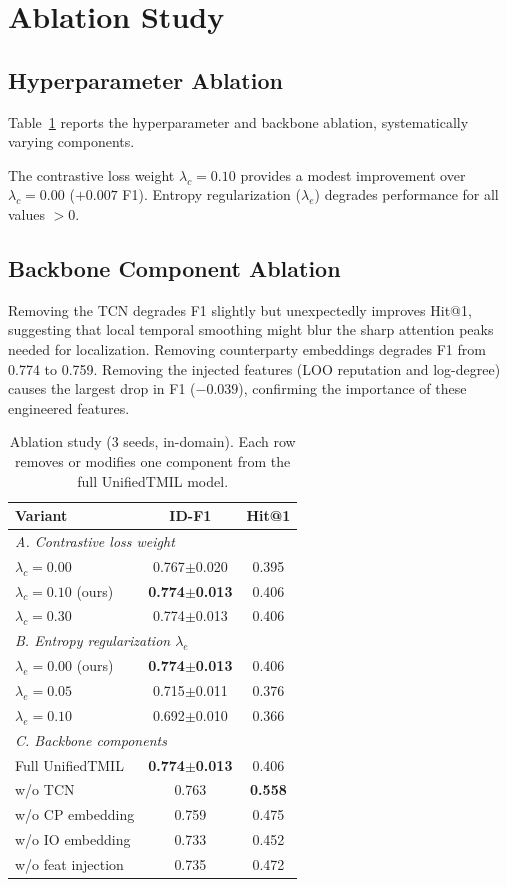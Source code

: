 \documentclass[conference]{IEEEtran}
\begin{document}
\section{Ablation Study}

\subsection{Hyperparameter Ablation}
Table~\ref{tab:abl} reports the hyperparameter and backbone ablation, systematically varying components.

The contrastive loss weight $\lambda_c=0.10$ provides a modest improvement over $\lambda_c=0.00$ ($+0.007$ F1). Entropy regularization ($\lambda_e$) degrades performance for all values $>0$.

\subsection{Backbone Component Ablation}
Removing the TCN degrades F1 slightly but unexpectedly improves Hit@1, suggesting that local temporal smoothing might blur the sharp attention peaks needed for localization. Removing counterparty embeddings degrades F1 from 0.774 to 0.759. Removing the injected features (LOO reputation and log-degree) causes the largest drop in F1 ($-0.039$), confirming the importance of these engineered features.

\begin{table}[!t]
\centering
\caption{Ablation study (3 seeds, in-domain). Each row removes or modifies one component from the full UnifiedTMIL model.}
\label{tab:abl}
\begin{tabular}{lcc}
\toprule
\textbf{Variant} & \textbf{ID-F1} & \textbf{Hit@1} \\
\midrule
\multicolumn{3}{l}{\emph{A. Contrastive loss weight}} \\
\quad $\lambda_c=0.00$ & 0.767$\pm$0.020 & 0.395 \\
\quad $\lambda_c=0.10$ (ours) & \textbf{0.774$\pm$0.013} & 0.406 \\
\quad $\lambda_c=0.30$ & 0.774$\pm$0.013 & 0.406 \\
\midrule
\multicolumn{3}{l}{\emph{B. Entropy regularization $\lambda_e$}} \\
\quad $\lambda_e=0.00$ (ours) & \textbf{0.774$\pm$0.013} & 0.406 \\
\quad $\lambda_e=0.05$ & 0.715$\pm$0.011 & 0.376 \\
\quad $\lambda_e=0.10$ & 0.692$\pm$0.010 & 0.366 \\
\midrule
\multicolumn{3}{l}{\emph{C. Backbone components}} \\
\quad Full UnifiedTMIL & \textbf{0.774$\pm$0.013} & 0.406 \\
\quad w/o TCN & 0.763 & \textbf{0.558} \\
\quad w/o CP embedding & 0.759 & 0.475 \\
\quad w/o IO embedding & 0.733 & 0.452 \\
\quad w/o feat injection & 0.735 & 0.472 \\
\bottomrule
\end{tabular}
\end{table}
\end{document}
